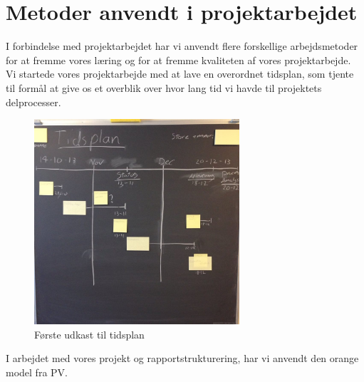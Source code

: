 \documentclass[article,oneside,12pt]{memoir}
\begin{document}
\section{Metoder anvendt i projektarbejdet}
I forbindelse med projektarbejdet har vi anvendt flere forskellige arbejdsmetoder for at fremme vores læring og for at fremme kvaliteten af vores projektarbejde.\\
Vi startede vores projektarbejde med at lave en overordnet tidsplan, som tjente til formål at give os et overblik over hvor lang tid vi havde til projektets delprocesser.
\begin{figure}[h]
    \centering
    \includegraphics[width=3in]{tidsplan.jpg}
    \caption{Første udkast til tidsplan}
\end{figure}
\clearpage
I arbejdet med vores projekt og rapportstrukturering, har vi anvendt den orange model fra PV.
\end{document}

